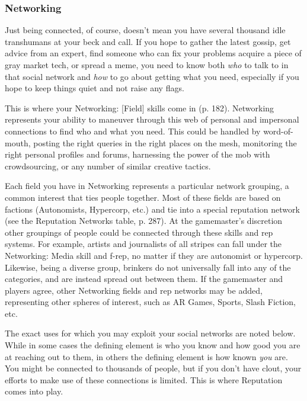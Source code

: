 \subsubsection{Networking}

Just being connected, of course, doesn't mean you have 
several thousand idle transhumans at your beck and 
call. If you hope to gather the latest gossip, get advice 
from an expert, find someone who can fix your problems
acquire a piece of gray market tech, or spread a
meme, you need to know both \textit{who} to talk to in that 
social network and \textit{how} to go about getting what you 
need, especially if you hope to keep things quiet and 
not raise any flags.

This is where your Networking: [Field] skills come 
in (p. 182). Networking represents your ability to maneuver
through this web of personal and impersonal
connections to find who and what you need. This 
could be handled by word-of-mouth, posting the right 
queries in the right places on the mesh, monitoring 
the right personal profiles and forums, harnessing the 
power of the mob with crowdsourcing, or any number 
of similar creative tactics.

Each field you have in Networking represents a 
particular network grouping, a common interest that 
ties people together. Most of these fields are based 
on factions (Autonomists, Hypercorp, etc.) and tie 
into a special reputation network (see the Reputation 
Networks table, p. 287). At the gamemaster's discretion
other groupings of people could be connected
through these skills and rep systems. For example, 
artists and journalists of all stripes can fall under 
the Networking: Media skill and f-rep, no matter if 
they are autonomist or hypercorp. Likewise, being a 
diverse group, brinkers do not universally fall into any 
of the categories, and are instead spread out between 
them. If the gamemaster and players agree, other 
Networking fields and rep networks may be added, 
representing other spheres of interest, such as AR 
Games, Sports, Slash Fiction, etc.

The exact uses for which you may exploit your social 
networks are noted below. While in some cases the defining
element is who you know and how good you are
at reaching out to them, in others the defining element 
is how known \textit{you} are. You might be connected to 
thousands of people, but if you don't have clout, your 
efforts to make use of these connections is limited. This 
is where Reputation comes into play.


